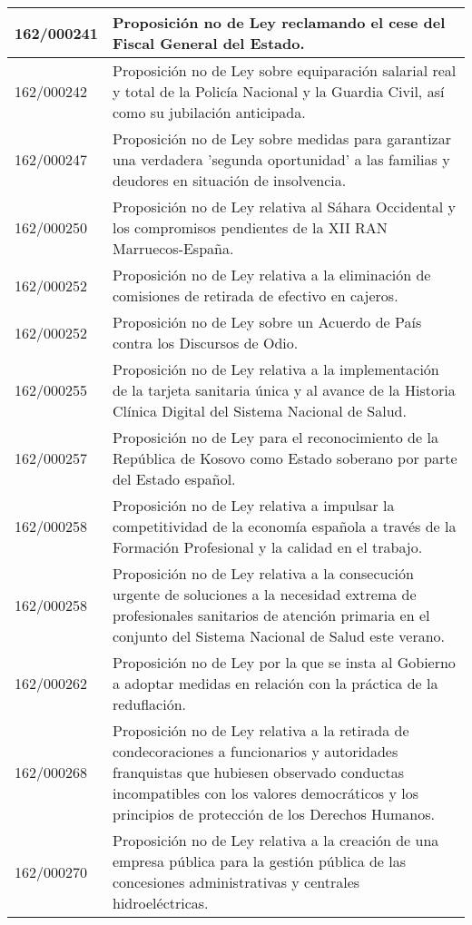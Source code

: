 {\begin{table}[H]
\begin{center}
\begin{tabularx}{\linewidth}{| l | X |}
\hline
162/000241 & Proposición no de Ley reclamando el cese del Fiscal General del Estado. \\
\hline
162/000242 & Proposición no de Ley sobre equiparación salarial real y total de la Policía Nacional y la Guardia Civil, así como su jubilación anticipada. \\
\hline
162/000247 & Proposición no de Ley sobre medidas para garantizar una verdadera 'segunda oportunidad' a las familias y deudores en situación de insolvencia. \\
\hline
162/000250 & Proposición no de Ley relativa al Sáhara Occidental y los compromisos pendientes de la XII RAN Marruecos-España. \\
\hline
162/000252 & Proposición no de Ley relativa a la eliminación de comisiones de retirada de efectivo en cajeros. \\
\hline
162/000252 & Proposición no de Ley sobre un Acuerdo de País contra los Discursos de Odio. \\
\hline
162/000255 & Proposición no de Ley relativa a la implementación de la tarjeta sanitaria única y al avance de la Historia Clínica Digital del Sistema Nacional de Salud. \\
\hline
162/000257 & Proposición no de Ley para el reconocimiento de la República de Kosovo como Estado soberano por parte del Estado español. \\
\hline
162/000258 & Proposición no de Ley relativa a impulsar la competitividad de la economía española a través de la Formación Profesional y la calidad en el trabajo. \\
\hline
162/000258 & Proposición no de Ley relativa a la consecución urgente de soluciones a la necesidad extrema de profesionales sanitarios de atención primaria en el conjunto del Sistema Nacional de Salud este verano. \\
\hline
162/000262 & Proposición no de Ley por la que se insta al Gobierno a adoptar medidas en relación con la práctica de la reduflación. \\
\hline
162/000268 & Proposición no de Ley relativa a la retirada de condecoraciones a funcionarios y autoridades franquistas que hubiesen observado conductas incompatibles con los valores democráticos y los principios de protección de los Derechos Humanos. \\
\hline
162/000270 & Proposición no de Ley relativa a la creación de una empresa pública para la gestión pública de las concesiones administrativas y centrales hidroeléctricas. \\

\end{tabularx}
\end{center}
\end{table}}
